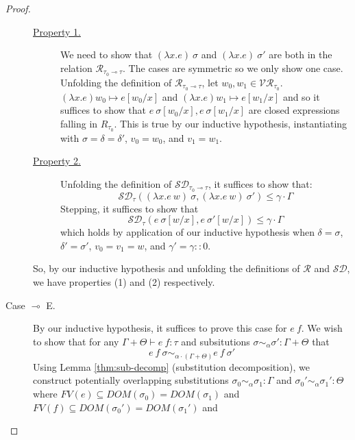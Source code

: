\begin{proof}
\begin{description}
      \begin{description}
        \item[\underline{Property 1.}] We need to show that $(\lambda x . e)~\sigma$ and
          $(\lambda x . e)~\sigma'$ are both in the relation $\mathcal{R}_{\tau_0 \multimap
          \tau}$. The cases are symmetric so we only show one case. Unfolding
          the definition of $\mathcal{R}_{\tau_0 \multimap \tau}$, let $w_0, w_1
          \in \mathcal{VR}_{\tau_0}$. 
          $(\lambda x . e) w_0 \mapsto e[w_0/x]$
          and
          $(\lambda x . e) w_1 \mapsto e[w_1/x]$
          and so it suffices to show that
          $e~\sigma[w_0/x], e~\sigma[w_1/x]$ 
          are closed expressions falling in $R_{\tau_0}$.
          This is true by our inductive hypothesis, instantiating with $\sigma =
          \delta = \delta'$, $v_0 = w_0$, and $v_1 = w_1$.
        \item[\underline{Property 2.}] Unfolding the definition of
          $\mathcal{SD}_{\tau_0 \multimap \tau}$, it suffices to show that:
          $$
          \mathcal{SD}_{\tau}
          ((\lambda x . e~w)~\sigma, (\lambda x . e~w)~\sigma') 
          \leq \gamma \cdot \Gamma
          $$
          Stepping, it suffices to show that
          $$
          \mathcal{SD}_{\tau}
          (e~\sigma[w/x], e~\sigma'[w/x]) 
          \leq \gamma \cdot \Gamma
          $$
          which holds by application of our inductive hypothesis when $\delta =
          \sigma$, $\delta' = \sigma'$, $v_0 = v_1 = w$, and $\gamma' = \gamma
          :: 0$.
      \end{description}
      So, by our inductive hypothesis and unfolding the definitions of
      $\mathcal{R}$ and $\mathcal{SD}$, we have properties (1) and (2)
      respectively. 
    \item[Case $\multimap$ E.] 
      By our inductive hypothesis, it suffices
      to prove this case for $e~f$.
      We wish to show that for any $\Gamma + \Theta \vdash e~f : \tau$ and
      subsitutions 
      $\sigma \sim_{\alpha} \sigma': \Gamma + \Theta$ 
      that 
      $$e~f~\sigma \sim_{\alpha \cdot (\Gamma + \Theta)} e~f~\sigma'$$
      Using Lemma \ref{thm:sub-decomp} (substitution decomposition), we
      construct potentially overlapping substitutions
      $\sigma_0 \sim_{\alpha} \sigma_1 : \Gamma$
      and $\sigma_0' \sim_{\alpha} \sigma_1' : \Theta$
      where $FV(e) \subseteq DOM(\sigma_0) = DOM(\sigma_1)$ and
      $FV(f) \subseteq DOM(\sigma_0') = DOM(\sigma_1')$ and 

\end{description}
\end{proof}
